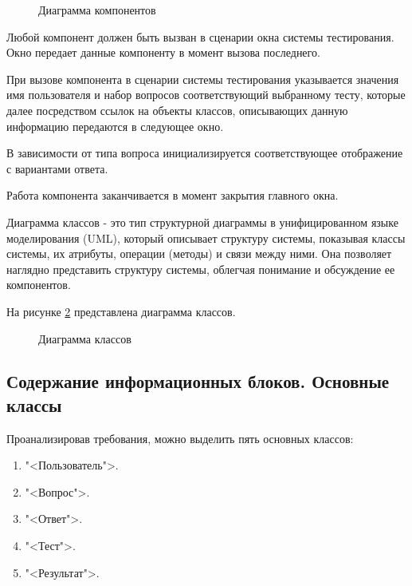 \newpage

\begin{landscape}
	\begin{figure}[ht]
		\caption{Диаграмма компонентов}
		\label{system_template:image}
	\end{figure}
\end{landscape}

Любой компонент должен быть вызван в сценарии окна системы тестирования. Окно передает данные компоненту в момент вызова последнего.

При вызове компонента в сценарии системы тестирования указывается значения имя пользователя и набор вопросов соответствующий выбранному тесту, которые далее посредством ссылок на объекты классов, описывающих данную информацию передаются в следующее окно.

В зависимости от типа вопроса инициализируется соответствующее отображение с вариантами ответа.

Работа компонента заканчивается в момент закрытия главного окна.

Диаграмма классов - это тип структурной диаграммы в унифицированном языке моделирования (UML), который описывает структуру системы, показывая классы системы, их атрибуты, операции (методы) и связи между ними. Она позволяет наглядно представить структуру системы, облегчая понимание и обсуждение ее компонентов.

На рисунке \ref{class_diagram:image} представлена диаграмма классов.

\newpage
\begin{landscape}
	\begin{figure}[ht]
		\caption{Диаграмма классов}
		\label{class_diagram:image}
	\end{figure}
\end{landscape}

\newpage

\subsection{Содержание информационных блоков. Основные классы}

Проанализировав требования, можно выделить пять основных классов:
\begin{enumerate}
	\item "<Пользователь">.
	\item "<Вопрос">.
	\item "<Ответ">.
	\item "<Тест">.
	\item "<Результат">.
\end{enumerate}

